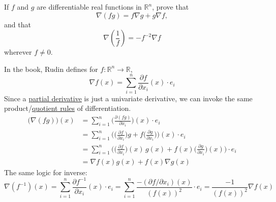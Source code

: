 	\begin{exercise}[Rudin 9.11]
		If $f$ and $g$ are differentiable real functions in $\mathbb{R}^n$, prove that
		\begin{equation}
			\nabla(fg)=f\nabla g+g\nabla f,
		\end{equation}
		and that
		\begin{equation}
			\nabla\left(\frac{1}{f}\right)=-f^{-2}\nabla f
		\end{equation}
		wherever $f\neq 0$.
	\end{exercise}
	\begin{solution}
		In the book, Rudin defines for $f: \mathbb{R}^n \to \mathbb{R}$, 
		\begin{equation}
			\nabla f (x) = \sum_{i=1}^n \frac{\partial f}{\partial x_i} (x) \cdot e_i 
		\end{equation}
		Since a \hyperref[def:partial-derivative]{partial derivative} is just a univariate derivative, we can invoke the same product/\hyperref[thm:quotient-rule]{quotient rules} of differentiation. 
		\begin{align}
			\big( \nabla (fg) \big) (x) & = \sum_{i=1}^n \bigg( \frac{\partial (fg)}{\partial x_i} \bigg) (x) \cdot e_i \\ 
																	& = \sum_{i=1}^n \bigg( \Big( \frac{\partial f}{\partial x_i} \Big) g + f \Big( \frac{\partial g}{\partial x_i} \Big) \bigg) (x) \cdot e_i \\ 
																	& = \sum_{i=1}^n \bigg( \Big( \frac{\partial f}{\partial x_i}\Big) (x) \, g(x) + f(x) \Big( \frac{\partial g}{\partial x_i} \Big) (x) \bigg) \cdot e_i \\ 
																	& = \nabla f (x) g(x) + f (x) \nabla g(x)
		\end{align}
		The same logic for inverse: 
		\begin{equation}
			\nabla (f^{-1}) (x) = \sum_{i=1}^n \frac{\partial f^{-1}}{\partial x_i} (x) \cdot e_i = \sum_{i=1}^n \frac{-(\partial f/\partial x_i) (x)}{(f(x))^2} \cdot e_i = \frac{-1}{(f(x))^2} \nabla f(x)
		\end{equation}
	\end{solution}

